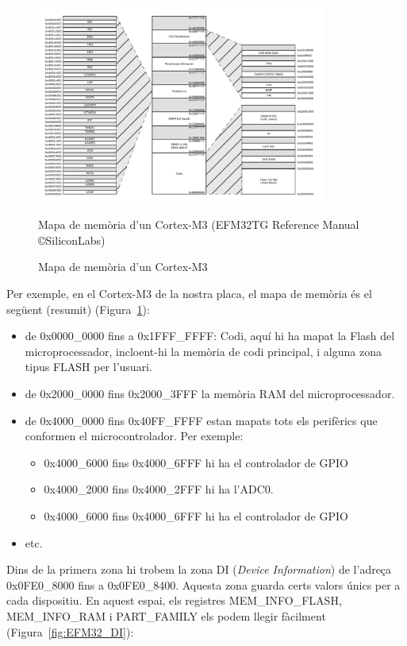 \begin{figure}
 \centering
 \includegraphics[width=0.85\textwidth, keepaspectratio]{imatges/Cortex-M3-MemoryMap.png}
 \caption{Mapa de memòria d'un Cortex-M3}{Mapa de memòria d'un Cortex-M3 (EFM32TG Reference Manual \cite{EFM32GRM} \copyright SiliconLabs)}
 \label{fig:M3MemoryMap}
\end{figure}

Per exemple, en el Cortex-M3 de la nostra placa, el mapa de memòria és el següent (resumit) (Figura~\ref{fig:M3MemoryMap}):
\begin{itemize}
\item de 0x0000\_0000 fins a 0x1FFF\_FFFF: Codi, aquí hi ha mapat la Flash del microprocessador, incloent-hi la memòria de codi principal, i alguna zona tipus FLASH per l’usuari.
\item de 0x2000\_0000 fins 0x2000\_3FFF la memòria RAM del microprocessador.
\item de 0x4000\_0000 fins 0x40FF\_FFFF estan mapats tots els perifèrics que conformen el microcontrolador. Per exemple:
\begin{itemize}
\item 0x4000\_6000 fins 0x4000\_6FFF hi ha el controlador de \gls{GPIO}
\item 0x4000\_2000 fins 0x4000\_2FFF hi ha l’ADC0.
\item 0x4000\_6000 fins 0x4000\_6FFF hi ha el controlador de GPIO
\end{itemize}
\item etc.
\end{itemize}

Dins de la primera zona hi trobem la zona DI ({\em Device Information}) de l’adreça 0x0FE0\_8000 fins a 0x0FE0\_8400. Aquesta zona guarda certs valors únics per a cada dispositiu. En aquest espai, els registres MEM\_INFO\_FLASH, MEM\_INFO\_RAM i PART\_FAMILY els podem llegir fàcilment \cite[24]{EFM32GRM} (Figura~\ref{fig:EFM32_DI}):

